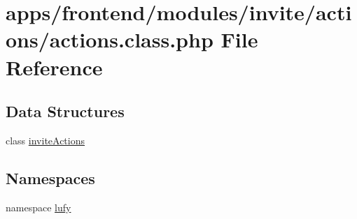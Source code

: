 \hypertarget{frontend_2modules_2invite_2actions_2actions_8class_8php}{\section{apps/frontend/modules/invite/actions/actions.class.\-php File Reference}
\label{frontend_2modules_2invite_2actions_2actions_8class_8php}
}
\subsection*{Data Structures}
\begin{DoxyCompactItemize}
\item 
class \hyperlink{classinvite_actions}{invite\-Actions}
\end{DoxyCompactItemize}
\subsection*{Namespaces}
\begin{DoxyCompactItemize}
\item 
namespace \hyperlink{namespacelufy}{lufy}
\end{DoxyCompactItemize}
